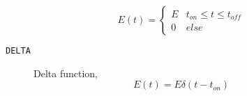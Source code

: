 \documentclass[12pt]{article}
\begin{document}
\begin{description}
\begin{description}
            \begin{equation*}
            E(t) = \begin{cases}
              E  & t_{on} \leq t \leq t_{off} \\
              0  & else 
            \end{cases}
            \end{equation*}
          \item[\texttt{DELTA}] Delta function,
            \begin{equation*}
            E(t) = E \delta(t - t_{on})
            \end{equation*}
        \end{description}



    \end{description}

    
    
    
\end{document}
